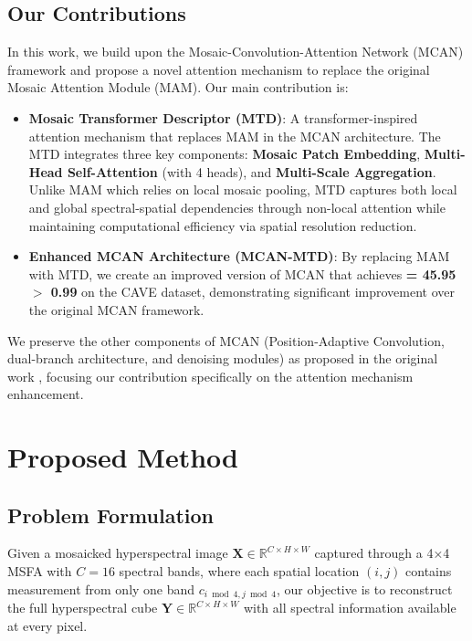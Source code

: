 \documentclass[conference]{IEEEtran}
\begin{document}
\subsection{Our Contributions}

In this work, we build upon the Mosaic-Convolution-Attention Network (MCAN) \cite{Feng2021} framework and propose a novel attention mechanism to replace the original Mosaic Attention Module (MAM). Our main contribution is:

\begin{itemize}
    \item \textbf{Mosaic Transformer Descriptor (MTD)}: A transformer-inspired attention mechanism that replaces MAM in the MCAN architecture. The MTD integrates three key components: \textbf{Mosaic Patch Embedding}, \textbf{Multi-Head Self-Attention} (with 4 heads), and \textbf{Multi-Scale Aggregation}. Unlike MAM which relies on local mosaic pooling, MTD captures both local and global spectral-spatial dependencies through non-local attention while maintaining computational efficiency via spatial resolution reduction.
    
    \item \textbf{Enhanced MCAN Architecture (MCAN-MTD)}: By replacing MAM with MTD, we create an improved version of MCAN that achieves \textbf{ = 45.95~ \quad {} \quad {} $>$ 0.99} on the CAVE dataset, demonstrating significant improvement over the original MCAN framework.
\end{itemize}

We preserve the other components of MCAN (Position-Adaptive Convolution, dual-branch architecture, and denoising modules) as proposed in the original work \cite{Feng2021}, focusing our contribution specifically on the attention mechanism enhancement.

\section{Proposed Method}

\subsection{Problem Formulation}

Given a mosaicked hyperspectral image $\mathbf{X} \in \mathbb{R}^{C \times H \times W}$ captured through a 4×4 MSFA with $C=16$ spectral bands, where each spatial location $(i,j)$ contains measurement from only one band $c_{i \bmod 4, j \bmod 4}$, our objective is to reconstruct the full hyperspectral cube $\mathbf{Y} \in \mathbb{R}^{C \times H \times W}$ with all spectral information available at every pixel.
\end{document}
